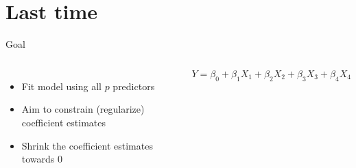 \documentclass[aspectratio=169,usenames,dvipsnames]{beamer}
\newcommand{\InstructorList}[1]{
\begin{itemize}
	\color{orange}
	#1
\end{itemize}
}
\renewcommand{\InstructorList}[1]{}
\begin{document}
\section{Last time}

\begin{frame}[c]{Goal}

	\begin{columns}
	\centering
	\begin{itemize}
		\item Fit model using all $p$ predictors
		\item Aim to constrain (regularize) coefficient estimates
		\item Shrink the coefficient estimates towards 0
	\end{itemize}
	\centering
	
	\begin{equation*}
		Y = \beta_0 + \beta_1 X_1 + \beta_2 X_2 + \beta_3 X_3 + \beta_4 X_4
	\end{equation*}
	\InstructorList{
	\item Ridge regression
	\item Lasso
	}
	\end{columns}
	
	\end{frame}
\end{document}
